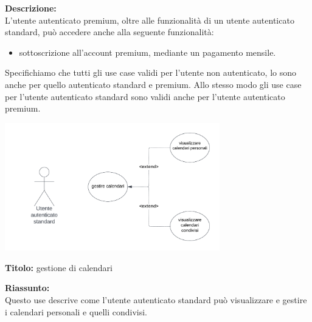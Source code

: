 \begin{listaPersonale}[UC]{}
\begin{listaPersonale2} [UC] {}
        \textbf{Descrizione:} \\
        L'utente autenticato premium, oltre alle funzionalità di un utente autenticato standard, può accedere anche alla seguente funzionalità:
        \begin{itemize}
            \item sottoscrizione all'account premium, mediante un pagamento mensile.
        \end{itemize}
    \end{listaPersonale2}
    Specifichiamo che tutti gli use case validi per l'utente non autenticato, lo sono anche per quello autenticato standard e premium. Allo stesso modo gli use case per l'utente autenticato standard sono validi anche per l'utente autenticato premium.
    \newpage



    \begin{center}
        \includegraphics[width=0.7\textwidth]{img/Diagrammi/UseCases/CondivisioneCalendario.png}
    \end{center}

    \textbf{Titolo:} gestione di calendari

    \textbf{Riassunto:} \\
    Questo use descrive come l'utente autenticato standard può visualizzare e gestire i calendari personali e quelli condivisi.


\end{listaPersonale}
